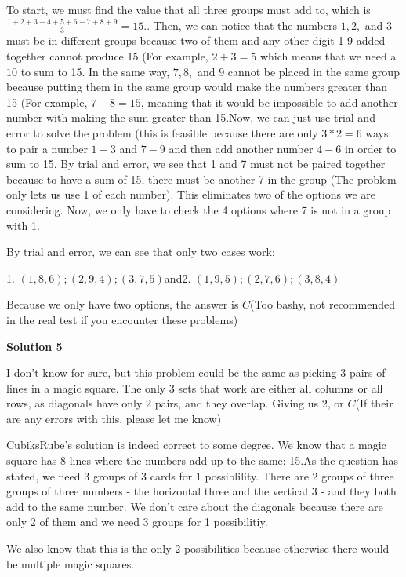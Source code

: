 \begin{enumerate}
To start, we must find the value that all three groups must add to, which is  $\frac{1+2+3+4+5+6+7+8+9}{3} = 15.$. Then, we can notice that the numbers $1, 2,$ and $3$ must be in different groups because two of them and any other digit 1-9 added together cannot produce 15 (For example, $2+3=5$ which means that we need a $10$ to sum to 15.  In the same way,  $7, 8,$ and $9$ cannot be placed in the same group because putting them in the same group would make the numbers greater than 15 (For example, $7+8=15$, meaning that it would be impossible to add another number with making the sum greater than 15.Now, we can just use trial and error to solve the problem (this is feasible because there are only $3*2=6$ ways to pair a number $1-3$ and $7-9$ and then add another number $4-6$ in order to sum to 15. By trial and error, we see that 1 and 7 must not be paired together because to have a sum of 15, there must be another 7 in the group (The problem only lets us use 1 of each number). This eliminates two of the options we are considering. Now, we only have to check the 4 options where 7 is not in a group with 1. 

 By trial and error, we can see that only two cases work:

 1. $(1,8,6); (2,9,4); (3,7,5)$and2. $(1,9,5); (2,7,6); (3,8,4)$

 Because we only have two options, the answer is $C$(Too bashy, not recommended in the real test if you encounter these problems)

 



\textbf{Solution 5}

I don't know for sure, but this problem could be the same as picking 3 pairs of lines in a magic square. The only 3 sets that work are either all columns or all rows, as diagonals have only 2 pairs, and they overlap. Giving us 2, or $C$(If their are any errors with this, please let me know)

 CubiksRube's solution is indeed correct to some degree. We know that a magic square has 8 lines where the numbers add up to the same: 15.As the question has stated, we need 3 groups of 3 cards for 1 possiblility. There are 2 groups of three groups of three numbers - the horizontal three and the vertical 3 - and they both add to the same number. We don't care about the diagonals because there are only 2 of them and we need 3 groups for 1 possibilitiy.

 We also know that this is the only 2 possibilities because otherwise there would be multiple magic squares.


\end{enumerate}
